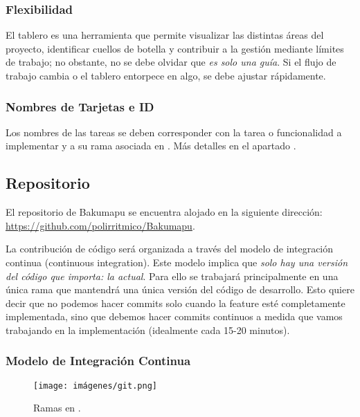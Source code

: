 \subsubsection{Flexibilidad}\label{flujo:flexibilidad}
El tablero es una herramienta que permite visualizar las distintas áreas del proyecto, identificar cuellos de botella y contribuir a la gestión mediante límites de trabajo; no obstante, no se debe olvidar que \emph{es solo una guía}. Si el flujo de trabajo cambia o el tablero entorpece en algo, se debe ajustar rápidamente.

\subsubsection{Nombres de Tarjetas e ID}\label{flujo:nombres-de-tarjetas}
Los nombres de las tareas se deben corresponder con la tarea o funcionalidad a implementar y a su rama asociada en . Más detalles en el apartado .


\subsection{Repositorio}\label{flujo:repositorio}
El repositorio  de Bakumapu se encuentra alojado en la siguiente dirección: \url{https://github.com/polirritmico/Bakumapu}.

La contribución de código será organizada a través del modelo de integración continua (continuous integration). Este modelo implica que \emph{solo hay una versión del código que importa: la actual}. Para ello se trabajará principalmente en una única rama que mantendrá una única versión del código de desarrollo. Esto quiere decir que no podemos hacer commits solo cuando la feature esté completamente implementada, sino que debemos hacer commits continuos a medida que vamos trabajando en la implementación (idealmente cada 15-20 minutos).

\subsubsection{Modelo de Integración Continua}\label{flujo:modelo-de-ramas}
\begin{figure}[H]
	\centering
	\texttt{[image: imágenes/git.png]}
	\caption{Ramas en .}
\end{figure}

